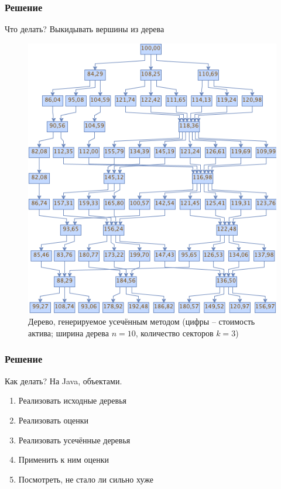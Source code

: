 \documentclass[unicode, notheorems]{beamer}
\begin{document}
  \begin{frame}
    \frametitle{Решение}
    \alert{Что делать?} 
    Выкидывать вершины из дерева
      \begin{figure}[h]
        \includegraphics[height=0.5\paperheight]{linear_tree}
        \caption{Дерево, генерируемое усечённым методом (цифры -- стоимость актива; ширина дерева $n=10$, количество секторов $k=3$)}
        \label{fig:linearTree}
      \end{figure} 
  \end{frame}

  \begin{frame}
    \frametitle{Решение}
    \alert{Как делать?} 
    На Java, объектами.
    \begin{enumerate}
      \item Реализовать исходные деревья
      \item Реализовать оценки
      \item Реализовать усечённые деревья
      \item Применить к ним оценки
      \item Посмотреть, не стало ли сильно хуже
    \end{enumerate}
  \end{frame}
\end{document}
